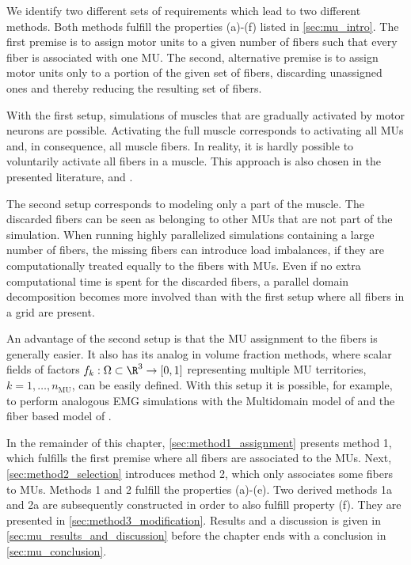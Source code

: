 We identify two different sets of requirements which lead to two different methods.
Both methods fulfill the properties (a)-(f) listed in \cref{sec:mu_intro}.
The first premise is to assign motor units to a given number of fibers such that every fiber is associated with one MU. The second, alternative premise is to assign motor units only to a portion of the given set of fibers, discarding unassigned ones and thereby reducing the resulting set of fibers.

With the first setup, simulations of muscles that are gradually activated by motor neurons are possible. Activating the full muscle corresponds to activating all MUs and, in consequence, all muscle fibers. In reality, it is hardly possible to voluntarily activate all fibers in a muscle. This approach is also chosen in the presented literature, \cite{Roehrle2012} and \cite{harry2018}.

The second setup corresponds to modeling only a part of the muscle. The discarded fibers can be seen as belonging to other MUs that are not part of the simulation. When running highly parallelized simulations containing a large number of fibers, the missing fibers can introduce load imbalances, if they are computationally treated equally to the fibers with MUs. Even if no extra computational time is spent for the discarded fibers, a parallel domain decomposition becomes more involved than with the first setup where all fibers in a grid are present.

An advantage of the second setup is that the MU assignment to the fibers is generally easier. It also has its analog in volume fraction methods, where scalar fields of factors $f_k: \Omega \subset \R^3 \to [0,1]$ representing multiple MU territories, $k=1, \dots, n_\text{MU}$, can be easily defined. With this setup it is possible, for example, to perform analogous EMG simulations with the Multidomain model of \cite{Klotz2020} and the fiber based model of \cite{Mordhorst2015}.

In the remainder of this chapter, \cref{sec:method1_assignment} presents method 1, which fulfills the first premise where all fibers are associated to the MUs. Next, \cref{sec:method2_selection} introduces method 2, which only associates some fibers to MUs. Methods 1 and 2 fulfill the properties (a)-(e). Two derived methods 1a and 2a are subsequently constructed in order to also fulfill property (f). They are presented in \cref{sec:method3_modification}. Results and a discussion is given in \cref{sec:mu_results_and_discussion} before the chapter ends with a conclusion in \cref{sec:mu_conclusion}.

